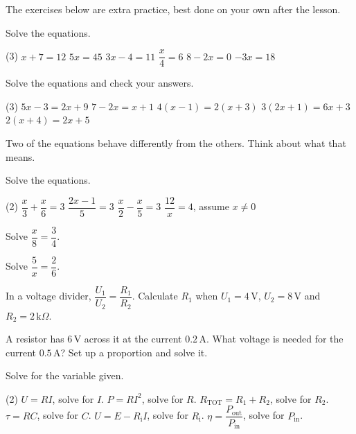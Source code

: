 The exercises below are extra practice, best done on your own after the lesson.

Solve the equations.
\begin{delar}(3)
  \task $x + 7 = 12$
  \task $5x = 45$
  \task $3x - 4 = 11$
  \task $\dfrac{x}{4} = 6$
  \task $8 - 2x = 0$
  \task $-3x = 18$
\end{delar}

Solve the equations and check your answers.
\begin{delar}(3)
  \task $5x - 3 = 2x + 9$
  \task $7 - 2x = x + 1$
  \task $4(x - 1) = 2(x + 3)$
  \task $3(2x + 1) = 6x + 3$
  \task $2(x + 4) = 2x + 5$
\end{delar}

\begin{aside}
\note[Tip] Two of the equations behave differently from the others. Think about what that means.
\end{aside}

Solve the equations.
\begin{delar}(2)
  \task $\dfrac{x}{3} + \dfrac{x}{6} = 3$
  \task $\dfrac{2x - 1}{5} = 3$
  \task $\dfrac{x}{2} - \dfrac{x}{5} = 3$
  \task $\dfrac{12}{x} = 4$, assume $x \neq 0$
\end{delar}

\begin{parts}
  \item Solve $\dfrac{x}{8} = \dfrac{3}{4}$.
  \item Solve $\dfrac{5}{x} = \dfrac{2}{6}$.
  \item In a voltage divider, $\dfrac{U_1}{U_2} = \dfrac{R_1}{R_2}$. Calculate $R_1$ when
    $U_1 = 4\,\text{V}$, $U_2 = 8\,\text{V}$ and $R_2 = 2\,\text{k}\Omega$.
  \item A resistor has $6\,\text{V}$ across it at the current $0.2\,\text{A}$. What voltage is
    needed for the current $0.5\,\text{A}$? Set up a proportion and solve it.
\end{parts}

Solve for the variable given.
\begin{delar}(2)
  \task $U = RI$, solve for $I$.
  \task $P = RI^2$, solve for $R$.
  \task $R_{\text{TOT}} = R_1 + R_2$, solve for $R_2$.
  \task $\tau = RC$, solve for $C$.
  \task $U = E - R_{\text{i}}I$, solve for $R_{\text{i}}$.
  \task $\eta = \dfrac{P_{\text{out}}}{P_{\text{in}}}$, solve for $P_{\text{in}}$.
\end{delar}

